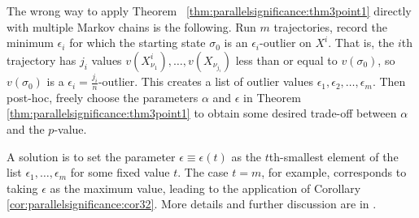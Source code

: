 \documentclass[12pt]{article}
\begin{document}
The wrong way to apply Theorem~%
\ref{thm:parallelsignificance:thm3point1} directly with multiple Markov
chains is the following.  Run \( m \) trajectories, record the minimum \(
\epsilon_i \) for which the starting state \( \sigma_0 \) is an \(
\epsilon_i \)-outlier on \( X^i \).  That is, the \( i \)th trajectory
has \( j_i \) values \( v(X_{\nu_1}^i), \dots, v(X_{\nu_{j_i}}) \) less
than or equal to \( v (\sigma_0) \), so \( v(\sigma_0) \) is a \(
\epsilon_i = \frac{j_{i}}{n} \)-outlier. This creates a list of outlier
values \( \epsilon_1 , \epsilon_2, \dots, \epsilon_ m \).  Then
post-hoc, freely choose the parameters \( \alpha \) and \( \epsilon \)
in Theorem~%
\ref{thm:parallelsignificance:thm3point1} to obtain some desired
trade-off between \( \alpha \) and the \( p \)-value.

A solution is to set the parameter \( \epsilon \equiv \epsilon(t) \) as
the \( t \)th-smallest element of the list \( \epsilon_1, \dots,
\epsilon_m \) for some fixed value \( t \).  The case \( t = m \), for
example, corresponds to taking \( \epsilon \) as the maximum value,
leading to the application of Corollary~%
\ref{cor:parallelsignificance:cor32}.  More details and further
discussion are in
\cite{doi:10.1080/2330443X.2020.1806763}.

\end{document}
